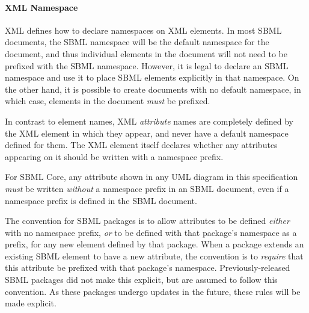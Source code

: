 \begin{blockChanged}
\paragraph{XML Namespace}

XML defines how to declare namespaces on XML elements.  In most SBML documents, the SBML namespace will be the default namespace for the document, and thus individual elements in the document will not need to be prefixed with the SBML namespace.  However, it is legal to declare an SBML namespace and use it to place SBML elements explicitly in that namespace.  On the other hand, it is possible to create documents with no default namespace, in which case, elements in the document \emph{must} be prefixed.

In contrast to element names, XML \emph{attribute} names are completely defined by the XML element in which they appear, and never have a default namespace defined for them.  The XML element itself declares whether any attributes appearing on it should be written with a namespace prefix.

For SBML Core, any attribute shown in any UML diagram in this specification \emph{must} be written \emph{without} a namespace prefix in an SBML document, even if a namespace prefix is defined in the SBML document.

The convention for SBML packages is to allow attributes to be defined \emph{either} with no namespace prefix, \emph{or} to be defined with that package's namespace as a prefix, for any new element defined by that package.  When a package extends an existing SBML element to have a new attribute, the convention is to \emph{require} that this attribute be prefixed with that package's namespace.  Previously-released SBML packages did not make this explicit, but are assumed to follow this convention.  As these packages undergo updates in the future, these rules will be made explicit.

\end{blockChanged}
